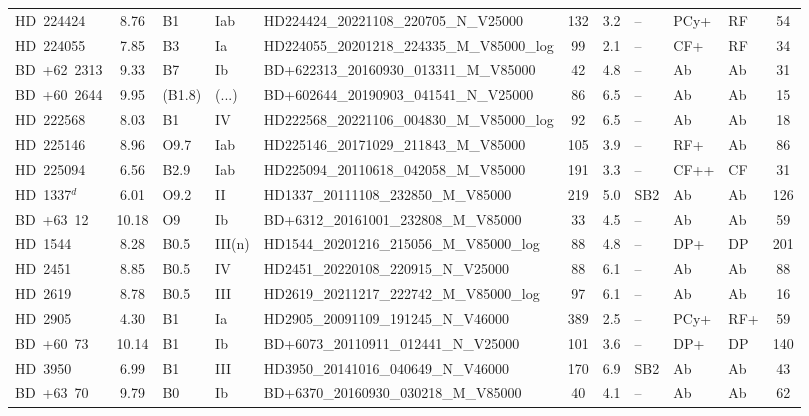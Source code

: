 {\begin{landscape}
\begin{longtable}{lclllcclllc}
\noalign{\smallskip}
HD~224424 & 8.76 & B1 & Iab & HD224424\_20221108\_220705\_N\_V25000 & 132 & 3.2 & -- & PCy+ & RF & 54 \\
\noalign{\smallskip}
HD~224055 & 7.85 & B3 & Ia & HD224055\_20201218\_224335\_M\_V85000\_log & 99 & 2.1 & -- & CF+ & RF & 34 \\
\noalign{\smallskip}
BD~+62~2313 & 9.33 & B7 & Ib & BD+622313\_20160930\_013311\_M\_V85000 & 42 & 4.8 & -- & Ab & Ab & 31 \\
\noalign{\smallskip}
BD~+60~2644 & 9.95 & (B1.8) & (...) & BD+602644\_20190903\_041541\_N\_V25000 & 86 & 6.5 & -- & Ab & Ab & 15 \\
\noalign{\smallskip}
HD~222568 & 8.03 & B1 & IV & HD222568\_20221106\_004830\_M\_V85000\_log & 92 & 6.5 & -- & Ab & Ab & 18 \\
\noalign{\smallskip}
HD~225146 & 8.96 & O9.7 & Iab & HD225146\_20171029\_211843\_M\_V85000 & 105 & 3.9 & -- & RF+ & Ab & 86 \\
\noalign{\smallskip}
HD~225094 & 6.56 & B2.9 & Iab & HD225094\_20110618\_042058\_M\_V85000 & 191 & 3.3 & -- & CF++ & CF & 31 \\
\noalign{\smallskip}
HD~1337$^{d}$ & 6.01 & O9.2 & II & HD1337\_20111108\_232850\_M\_V85000 & 219 & 5.0 & SB2 & Ab & Ab & 126 \\
\noalign{\smallskip}
BD~+63~12 & 10.18 & O9 & Ib & BD+6312\_20161001\_232808\_M\_V85000 & 33 & 4.5 & -- & Ab & Ab & 59 \\
\noalign{\smallskip}
HD~1544 & 8.28 & B0.5 & III(n) & HD1544\_20201216\_215056\_M\_V85000\_log & 88 & 4.8 & -- & DP+ & DP & 201 \\
\noalign{\smallskip}
HD~2451 & 8.85 & B0.5 & IV & HD2451\_20220108\_220915\_N\_V25000 & 88 & 6.1 & -- & Ab & Ab & 88 \\
\noalign{\smallskip}
HD~2619 & 8.78 & B0.5 & III & HD2619\_20211217\_222742\_M\_V85000\_log & 97 & 6.1 & -- & Ab & Ab & 16 \\
\noalign{\smallskip}
HD~2905 & 4.30 & B1 & Ia & HD2905\_20091109\_191245\_N\_V46000 & 389 & 2.5 & -- & PCy+ & RF+ & 59 \\
\noalign{\smallskip}
BD~+60~73 & 10.14 & B1 & Ib & BD+6073\_20110911\_012441\_N\_V25000 & 101 & 3.6 & -- & DP+ & DP & 140 \\
\noalign{\smallskip}
HD~3950 & 6.99 & B1 & III & HD3950\_20141016\_040649\_N\_V46000 & 170 & 6.9 & SB2 & Ab & Ab & 43 \\
\noalign{\smallskip}
BD~+63~70 & 9.79 & B0 & Ib & BD+6370\_20160930\_030218\_M\_V85000 & 40 & 4.1 & -- & Ab & Ab & 62 \\

\end{longtable}
\end{landscape}}
